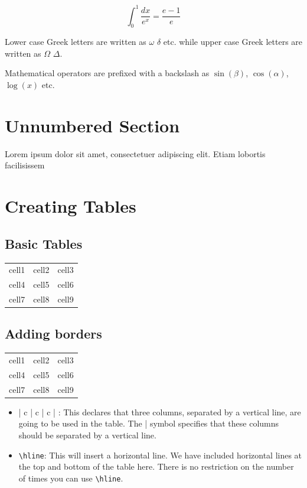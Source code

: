 \documentclass[12pt, a4paper]{report}
\begin{document}
\[ \int_0^1 \frac{dx}{e^x} =  \frac{e-1}{e} \]

Lower case Greek letters are written as $\omega$ $\delta$ etc. while upper case Greek letters are written as $\Omega$ $\Delta$.

Mathematical operators are prefixed with a backslash as $\sin(\beta)$, $\cos(\alpha)$, $\log(x)$ etc.

\section*{Unnumbered Section}
Lorem ipsum dolor sit amet, consectetuer adipiscing elit. Etiam lobortis facilisissem

\section{Creating Tables}

\subsection{Basic Tables}
\begin{center}
    \begin{tabular}{ c c c }
        cell1 & cell2 & cell3 \\
        cell4 & cell5 & cell6 \\
        cell7 & cell8 & cell9
    \end{tabular}
\end{center}

\subsection{Adding borders}
\begin{center}
    \begin{tabular}{ |c|c|c| }
        \hline
        cell1 & cell2 & cell3 \\
        cell4 & cell5 & cell6 \\
        cell7 & cell8 & cell9 \\
        \hline
    \end{tabular}
\end{center}

\begin{itemize}
    \item { | c | c | c | }: This declares that three columns, separated by a vertical line, are going to be used in the table. The | symbol specifies that these columns should be separated by a vertical line.
    \item \verb|\hline|: This will insert a horizontal line. We have included horizontal lines at the top and bottom of the table here. There is no restriction on the number of times you can use \verb|\hline|.
\end{itemize}
\end{document}
